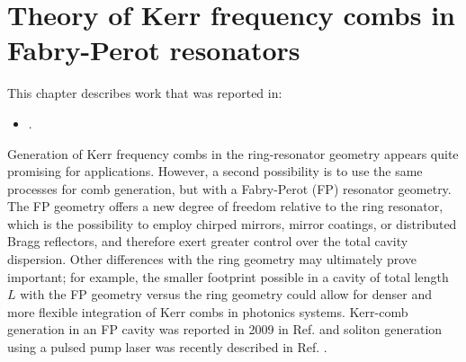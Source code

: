  \chapter{Theory of Kerr frequency combs in Fabry-Perot resonators} \label{chap:FPLLE}
 
 \begin{footnotesize}
 \begin{spacing}{1.2}
 	This chapter describes work that was reported in:
 	\begin{itemize}
 		\item {}.\\
 	\end{itemize}
 \end{spacing}
\end{footnotesize}

Generation of Kerr frequency combs in the ring-resonator geometry appears quite promising for applications. However, a second possibility is to use the same processes for comb generation, but with a Fabry-Perot (FP) resonator geometry. The FP geometry offers a new degree of freedom relative to the ring resonator, which is the possibility to employ chirped mirrors, mirror coatings, or distributed Bragg reflectors, and therefore exert greater control over the total cavity dispersion. Other differences with the ring geometry may ultimately prove important; for example, the smaller footprint possible in a cavity of total length $L$ with the FP geometry versus the ring geometry could allow for denser and more flexible integration of Kerr combs in photonics systems. Kerr-comb generation in an FP cavity was reported in 2009 in Ref.  and soliton generation using a pulsed pump laser was recently described in Ref. .

